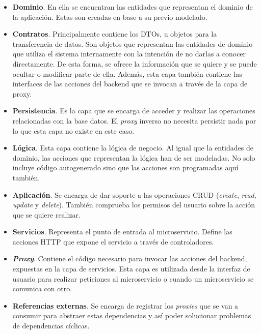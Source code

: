 \documentclass[11pt,spanish,listoffigures]{tfgetsinf}
\begin{document}
\begin{itemize}

	\item \textbf{Dominio}. En ella se encuentran las entidades que representan el dominio de la aplicación. Estas son creadas en base a su previo modelado.

	\item \textbf{Contratos}. Principalmente contiene los DTOs, u objetos para la transferencia de datos. Son objetos que representan las entidades de dominio que utiliza el sistema internamente con la intención de no darlas a conocer directamente. De esta forma, se ofrece la información que se quiere y se puede ocultar o modificar parte de ella. Además, esta capa también contiene las interfaces de las acciones del backend que se invocan a través de la capa de proxy.

	\item \textbf{Persistencia}. Es la capa que se encarga de acceder y realizar las operaciones relacionadas con la base datos. El \emph{proxy} inverso no necesita persistir nada por lo que esta capa no existe en este caso.

	\item \textbf{Lógica}. Esta capa contiene la lógica de negocio. Al igual que la entidades de dominio, las acciones que representan la lógica han de ser modeladas. No solo incluye código autogenerado sino que las acciones son programadas aquí también.

	\item \textbf{Aplicación}. Se encarga de dar soporte a las operaciones CRUD (\emph{create}, \emph{read}, \emph{update} y \emph{delete}). También comprueba los permisos del usuario sobre la acción que se quiere realizar.

	\item \textbf{Servicios}. Representa el punto de entrada al microservicio. Define las acciones HTTP que expone el servicio a través de controladores.

	\item \textbf{\emph{Proxy}}. Contiene el código necesario para invocar las acciones del backend, expuestas en la capa de servicios. Esta capa es utilizada desde la interfaz de usuario para realizar peticiones al microservicio o cuando un microservicio se comunica con otro.

	\item \textbf{Referencias externas}. Se encarga de registrar los \emph{proxies} que se van a consumir para abstraer estas dependencias y así poder solucionar problemas de dependencias cíclicas.

\end{itemize}
\end{document}
